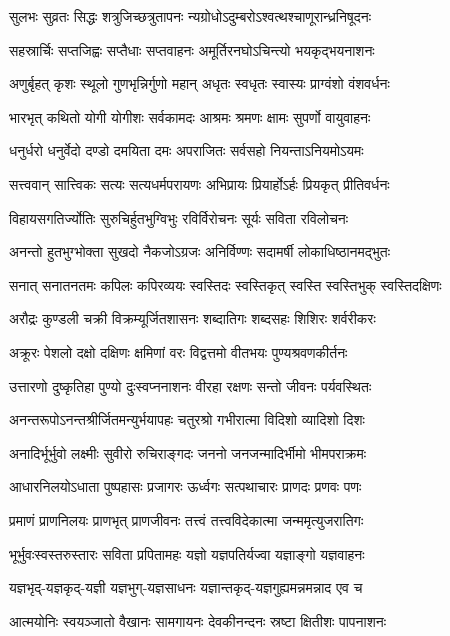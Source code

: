\twolineshloka
{सुलभः सुव्रतः सिद्धः शत्रुजिच्छत्रुतापनः}
{न्यग्रोधोऽदुम्बरोऽश्वत्थश्चाणूरान्ध्रनिषूदनः}

\twolineshloka
{सहस्रार्चिः सप्तजिह्वः सप्तैधाः सप्तवाहनः}
{अमूर्तिरनघोऽचिन्त्यो भयकृद्भयनाशनः}

\twolineshloka
{अणुर्बृहत् कृशः स्थूलो गुणभृन्निर्गुणो महान्}
{अधृतः स्वधृतः स्वास्यः प्राग्वंशो वंशवर्धनः}

\twolineshloka
{भारभृत् कथितो योगी योगीशः सर्वकामदः}
{आश्रमः श्रमणः क्षामः सुपर्णो वायुवाहनः}

\twolineshloka
{धनुर्धरो धनुर्वेदो दण्डो दमयिता दमः}
{अपराजितः सर्वसहो नियन्ताऽनियमोऽयमः}

\twolineshloka
{सत्त्ववान् सात्त्विकः सत्यः सत्यधर्मपरायणः}
{अभिप्रायः प्रियार्होऽर्हः प्रियकृत् प्रीतिवर्धनः}

\twolineshloka
{विहायसगतिर्ज्योतिः सुरुचिर्हुतभुग्विभुः}
{रविर्विरोचनः सूर्यः सविता रविलोचनः}

\twolineshloka
{अनन्तो हुतभुग्भोक्ता सुखदो नैकजोऽग्रजः}
{अनिर्विण्णः सदामर्षी लोकाधिष्ठानमद्भुतः}

\twolineshloka
{सनात् सनातनतमः कपिलः कपिरव्ययः}
{स्वस्तिदः स्वस्तिकृत् स्वस्ति स्वस्तिभुक् स्वस्तिदक्षिणः}

\twolineshloka
{अरौद्रः कुण्डली चक्री विक्रम्यूर्जितशासनः}
{शब्दातिगः शब्दसहः शिशिरः शर्वरीकरः}

\twolineshloka
{अक्रूरः पेशलो दक्षो दक्षिणः क्षमिणां वरः}
{विद्वत्तमो वीतभयः पुण्यश्रवणकीर्तनः}

\twolineshloka
{उत्तारणो दुष्कृतिहा पुण्यो दुःस्वप्ननाशनः}
{वीरहा रक्षणः सन्तो जीवनः पर्यवस्थितः}

\twolineshloka
{अनन्तरूपोऽनन्तश्रीर्जितमन्युर्भयापहः}
{चतुरश्रो गभीरात्मा विदिशो व्यादिशो दिशः}

\twolineshloka
{अनादिर्भूर्भुवो लक्ष्मीः सुवीरो रुचिराङ्गदः}
{जननो जनजन्मादिर्भीमो भीमपराक्रमः}

\twolineshloka
{आधारनिलयोऽधाता पुष्पहासः प्रजागरः}
{ऊर्ध्वगः सत्पथाचारः प्राणदः प्रणवः पणः}

\twolineshloka
{प्रमाणं प्राणनिलयः प्राणभृत् प्राणजीवनः}
{तत्त्वं तत्त्वविदेकात्मा जन्ममृत्युजरातिगः}

\twolineshloka
{भूर्भुवःस्वस्तरुस्तारः सविता प्रपितामहः}
{यज्ञो यज्ञपतिर्यज्वा यज्ञाङ्गो यज्ञवाहनः}

\twolineshloka
{यज्ञभृद्-यज्ञकृद्-यज्ञी यज्ञभुग्-यज्ञसाधनः}
{यज्ञान्तकृद्-यज्ञगुह्यमन्नमन्नाद एव च}

\twolineshloka
{आत्मयोनिः स्वयञ्जातो वैखानः सामगायनः}
{देवकीनन्दनः स्रष्टा क्षितीशः पापनाशनः}

